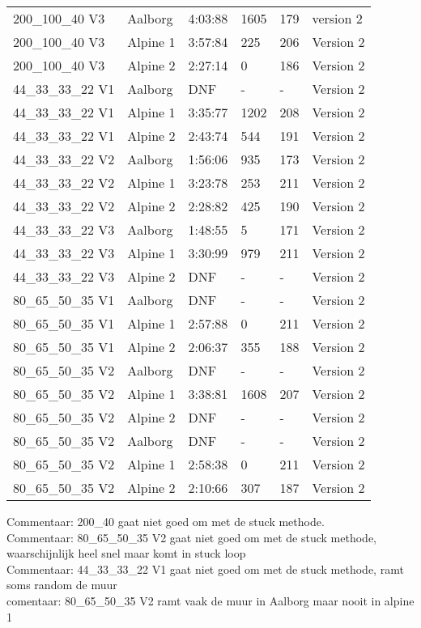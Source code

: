 \documentclass[pt,twoside,a4paper]{article}
\begin{document}
\begin{table}[h]
\begin{tabular}{llllll}
 200\_100\_40 V3 & Aalborg & 4:03:88 & 1605 & 179 & version 2 \\
 200\_100\_40 V3 & Alpine 1 & 3:57:84 & 225 & 206 & Version 2 \\
 200\_100\_40 V3 & Alpine 2 & 2:27:14 & 0 & 186 & Version 2 \\ \hline
 44\_33\_33\_22 V1 & Aalborg & DNF & - & - & Version 2 \\
 44\_33\_33\_22 V1 & Alpine 1 & 3:35:77 & 1202 & 208 & Version 2 \\
 44\_33\_33\_22 V1 & Alpine 2 & 2:43:74 & 544 & 191 & Version 2 \\ \hline
 44\_33\_33\_22 V2 & Aalborg & 1:56:06 & 935 & 173 & Version 2 \\
 44\_33\_33\_22 V2 & Alpine 1 & 3:23:78 & 253 & 211 & Version 2 \\
 44\_33\_33\_22 V2 & Alpine 2 & 2:28:82 & 425 & 190 & Version 2 \\ \hline
 44\_33\_33\_22 V3 & Aalborg & 1:48:55 & 5 & 171 & Version 2 \\
 44\_33\_33\_22 V3 & Alpine 1 & 3:30:99 & 979 & 211 & Version 2 \\
 44\_33\_33\_22 V3 & Alpine 2 & DNF & - & - & Version 2 \\ \hline
 80\_65\_50\_35 V1 & Aalborg & DNF & - & - & Version 2 \\
 80\_65\_50\_35 V1 & Alpine 1 & 2:57:88 & 0 & 211 & Version 2 \\
 80\_65\_50\_35 V1 & Alpine 2 & 2:06:37 & 355 & 188 & Version 2 \\ \hline
 80\_65\_50\_35 V2 & Aalborg & DNF & - & - & Version 2 \\
 80\_65\_50\_35 V2 & Alpine 1 & 3:38:81 & 1608 & 207 & Version 2 \\
 80\_65\_50\_35 V2 & Alpine 2 & DNF & - & - & Version 2 \\ \hline 
 80\_65\_50\_35 V2 & Aalborg & DNF & - & - & Version 2 \\
 80\_65\_50\_35 V2 & Alpine 1 & 2:58:38 & 0 & 211 & Version 2 \\
 80\_65\_50\_35 V2 & Alpine 2 & 2:10:66 & 307 & 187 & Version 2 \\ \hline
\end{tabular}
\end{table}

Commentaar: 200\_40 gaat niet goed om met de stuck methode.\\
Commentaar: 80\_65\_50\_35 V2 gaat niet goed om met de stuck methode, waarschijnlijk heel snel maar komt in stuck loop\\
Commentaar: 44\_33\_33\_22 V1 gaat niet goed om met de stuck methode, ramt soms random de muur \\
comentaar: 80\_65\_50\_35 V2 ramt vaak de muur in Aalborg maar nooit in alpine 1\\

\newpage
\end{document}
